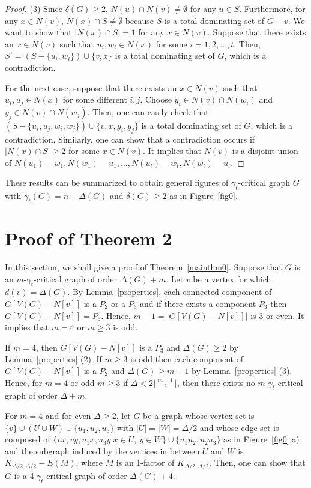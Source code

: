 \documentclass[12pt]{amsart}
\begin{document}
\begin{proof}
\noindent (3) Since $\delta(G) \ge 2$, $N(u) \cap N(v) \neq
\emptyset$ for any $u \in S$. Furthermore, for any $x \in N(v)$,
$N(x) \cap S \neq \emptyset$ because $S$ is a total dominating set
of $G-v$. We want to show that $|N(x) \cap S | = 1$ for any $ x
\in N(v)$. Suppose that there exists an $x \in N(v)$ such that
$u_i, w_i \in N(x)$ for some $i =1,2, \ldots,t $. Then, $S' =
(S-\{u_i,w_i \}) \cup \{v,x \}$ is a total dominating set of $G$,
which is a contradiction.

For the next case, suppose that there exists an $x \in N(v)$ such
that $u_i, u_j \in N(x)$ for some different $i,j$. Choose $y_i \in
N(v) \cap N(w_i)$ and $y_j \in  N(v) \cap N(w_j)$. Then, one can
easily check that $(S-\{u_i,u_j,w_i,w_j \}) \cup \{v,x,y_i,y_j \}$
is a total dominating set of $G$, which is a contradiction.
Similarly, one can show that a contradiction occurs if $|N(x) \cap
S| \ge 2$ for some $x \in N(v)$. It implies that $N(v)$ is a
disjoint union of $N(u_1)-w_1,N(w_1)-u_1, \ldots
,N(u_t)-w_t,N(w_t)-u_t $.
\end{proof}

These results can be summarized to obtain general figures of $\gamma_{t}$-critical
graph $G$ with $\gamma_{t}(G)=n-\Delta(G)$ and $\delta(G) \ge 2$ as
in Figure~\ref{fig0}.

\section{Proof of Theorem 2} \label{main}

In this section, we shall give a proof of Theorem~\ref{mainthm0}.
Suppose that $G$ is an $m$-$\gamma_t$-critical graph of order
$\Delta (G)+m$. Let $v$ be a vertex for which $d(v)=\Delta (G)$.
By Lemma~\ref{properties}, each connected component of
$G[V(G)-N[v]]$ is a $P_2$ or a $P_3$ and if there exists a component
$P_3$ then $G[V(G)-N[v]] = P_3$. Hence, $m-1 = |G[V(G)-N[v]]|$ is
3 or even. It implies that  $m=4$ or $m \ge 3$ is odd.

If $m=4$, then $G[V(G)-N[v]]$ is a $P_3$ and $\Delta(G) \ge 2$ by
Lemma~\ref{properties} (2). If $m \ge 3$ is odd then each component
of $G[V(G)-N[v]]$ is a $P_2$ and $\Delta(G) \ge m-1$ by
Lemma~\ref{properties} (3). Hence, for $m=4$ or odd $m \ge 3$ if
$\Delta < 2\lfloor\frac{m-1}{2}\rfloor$, then there exists no
$m$-$\gamma_t$-critical graph of order $\Delta + m$.

For $m=4$ and for even $\Delta \ge 2$, let $G$ be a graph whose vertex set
is $\{v\} \cup (U \cup W)\cup \{u_1,u_2,u_3 \}$ with $|U|=|W|=\Delta/2$
and whose edge set is composed of $\{vx, vy, u_1x, u_3y  | x \in U ,\  y \in W \} \cup\{u_1u_2, u_2u_3 \}$ as in Figure~\ref{fig0} a) and the subgraph induced by the vertices in between $U$ and $W$
 is $K_{\Delta/2, \Delta/2}-E(M)$, where $M$ is an 1-factor of $K_{\Delta/2, \Delta/2}$.
 Then, one can show that $G$ is a 4-$\gamma_t$-critical graph of order $\Delta (G)+4$.
\end{document}
